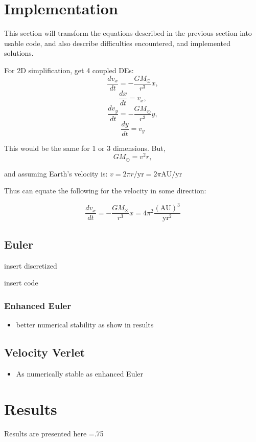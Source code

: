 \documentclass[12pt]{article}
\begin{document}
\section{Implementation}
This section will transform the equations described in the previous section into usable code, and also describe difficulties encountered, and implemented solutions.

For 2D simplification, get 4 coupled DEs:
\[
	\frac{dv_x}{dt}=-\frac{GM_{\odot}}{r^3}x,
\]
\[
	\frac{dx}{dt}=v_x,
\]
\[
	\frac{dv_y}{dt}=-\frac{GM_{\odot}}{r^3}y,
\]
\[
	\frac{dy}{dt}=v_y
\]

This would be the same for 1 or 3 dimensions. But,
\[
	GM_{\odot}=v^2r,
	\]

and assuming Earth's velocity is:
$v = 2\pi r/\mathrm{yr}=2\pi\mathrm{AU}/\mathrm{yr}$

Thus can equate the following for the velocity in some direction:

\[
	\frac{dv_x}{dt} = -\frac{GM_{\odot}}{r^3}x = 4\pi^2 \frac{(\mathrm{AU})^3}{\mathrm{yr}^2}
\]

\subsection{Euler}
insert discretized

insert code

\subsubsection{Enhanced Euler}
\begin{itemize}
	\item better numerical stability as show in results
\end{itemize}

\subsection{Velocity Verlet}
\begin{itemize}
	\item As numerically stable as enhanced Euler
\end{itemize}











\section{Results}
Results are presented here
\def \variable {my_var}=.75
\end{document}

